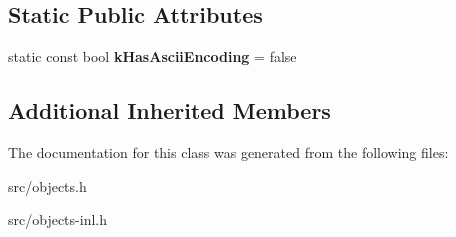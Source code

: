 \subsection*{Static Public Attributes}
\begin{DoxyCompactItemize}
\item 
\hypertarget{classv8_1_1internal_1_1_external_two_byte_string_a5a552ce81c00ca65f3d40d2c32c8d0d4}{}static const bool {\bfseries k\+Has\+Ascii\+Encoding} = false\label{classv8_1_1internal_1_1_external_two_byte_string_a5a552ce81c00ca65f3d40d2c32c8d0d4}

\end{DoxyCompactItemize}
\subsection*{Additional Inherited Members}


The documentation for this class was generated from the following files\+:\begin{DoxyCompactItemize}
\item 
src/objects.\+h\item 
src/objects-\/inl.\+h\end{DoxyCompactItemize}
